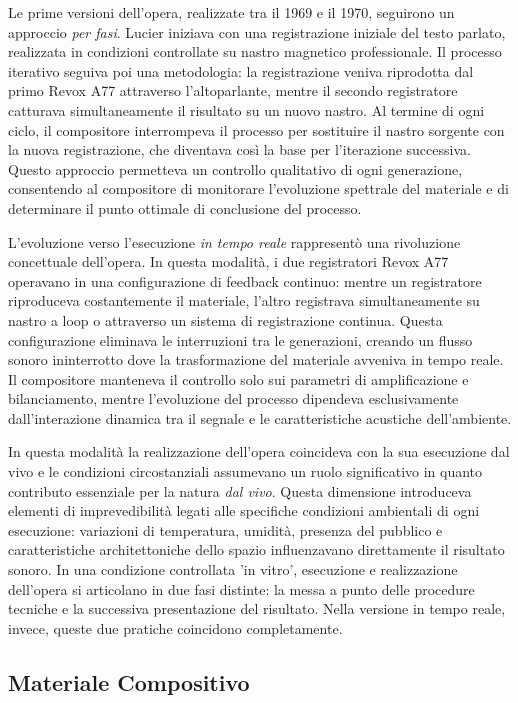 Le prime versioni dell'opera, realizzate tra il 1969 e il 1970, seguirono un approccio \textit{per fasi}. Lucier iniziava con una registrazione iniziale del testo parlato, realizzata in condizioni controllate su nastro magnetico professionale. Il processo iterativo seguiva poi una metodologia: la registrazione veniva riprodotta dal primo Revox A77 attraverso l'altoparlante, mentre il secondo registratore catturava simultaneamente il risultato su un nuovo nastro. Al termine di ogni ciclo, il compositore interrompeva il processo per sostituire il nastro sorgente con la nuova registrazione, che diventava così la base per l'iterazione successiva. Questo approccio permetteva un controllo qualitativo di ogni generazione, consentendo al compositore di monitorare l'evoluzione spettrale del materiale e di determinare il punto ottimale di conclusione del processo.

L'evoluzione verso l'esecuzione \textit{in tempo reale} rappresentò una rivoluzione concettuale dell'opera. In questa modalità, i due registratori Revox A77 operavano in una configurazione di feedback continuo: mentre un registratore riproduceva costantemente il materiale, l'altro registrava simultaneamente su nastro a loop o attraverso un sistema di registrazione continua. Questa configurazione eliminava le interruzioni tra le generazioni, creando un flusso sonoro ininterrotto dove la trasformazione del materiale avveniva in tempo reale. Il compositore manteneva il controllo solo sui parametri di amplificazione e bilanciamento, mentre l'evoluzione del processo dipendeva esclusivamente dall'interazione dinamica tra il segnale e le caratteristiche acustiche dell'ambiente.

In questa modalità la realizzazione dell'opera coincideva con la sua esecuzione dal vivo e le condizioni circostanziali assumevano un ruolo significativo in quanto contributo essenziale per la natura \textit{dal vivo}. Questa dimensione introduceva elementi di imprevedibilità legati alle specifiche condizioni ambientali di ogni esecuzione: variazioni di temperatura, umidità, presenza del pubblico e caratteristiche architettoniche dello spazio influenzavano direttamente il risultato sonoro. In una condizione controllata 'in vitro', esecuzione e realizzazione dell'opera si articolano in due fasi distinte: la messa a punto delle procedure tecniche e la successiva presentazione del risultato. Nella versione in tempo reale, invece, queste due pratiche coincidono completamente.

\subsection{Materiale Compositivo}

